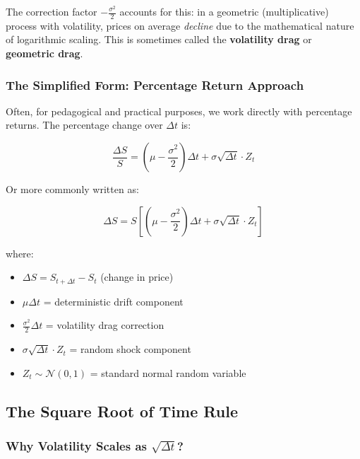 \documentclass[12pt,a4paper]{article}
\begin{document}
The correction factor $-\frac{\sigma^2}{2}$ accounts for this: in a geometric (multiplicative) process with volatility, prices on average \textit{decline} due to the mathematical nature of logarithmic scaling. This is sometimes called the \textbf{volatility drag} or \textbf{geometric drag}.

\subsubsection{The Simplified Form: Percentage Return Approach}

Often, for pedagogical and practical purposes, we work directly with percentage returns. The percentage change over $\Delta t$ is:

\begin{equation}
\frac{\Delta S}{S} = \left(\mu - \frac{\sigma^2}{2}\right) \Delta t + \sigma \sqrt{\Delta t} \cdot Z_t
\end{equation}

Or more commonly written as:

\begin{tcolorbox}[colback=green!10, colframe=green!50, title=GBM in Terms of Percentage Returns]
\begin{equation}
\boxed{\Delta S = S \left[(\mu - \frac{\sigma^2}{2}) \Delta t + \sigma \sqrt{\Delta t} \cdot Z_t\right]}
\end{equation}

where:
\begin{itemize}
    \item $\Delta S = S_{t+\Delta t} - S_t$ (change in price)
    \item $\mu \Delta t$ = deterministic drift component
    \item $\frac{\sigma^2}{2} \Delta t$ = volatility drag correction
    \item $\sigma \sqrt{\Delta t} \cdot Z_t$ = random shock component
    \item $Z_t \sim \mathcal{N}(0,1)$ = standard normal random variable
\end{itemize}
\end{tcolorbox}

\subsection{The Square Root of Time Rule}

\subsubsection{Why Volatility Scales as $\sqrt{\Delta t}$?}
\end{document}
